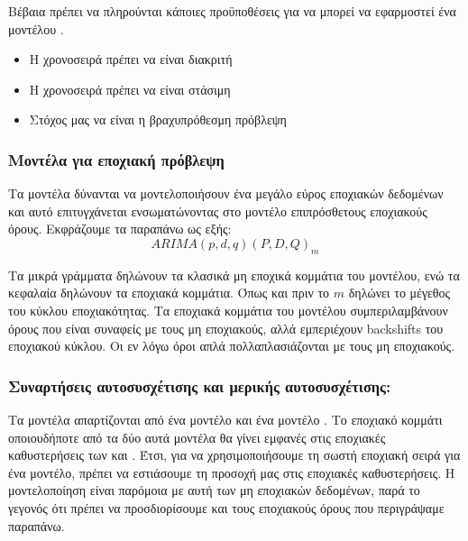 Βέβαια πρέπει να πληρούνται κάποιες προϋποθέσεις για να μπορεί να εφαρμοστεί ένα μοντέλου .
\begin{itemize}
  \item Η χρονοσειρά πρέπει να είναι διακριτή
  \item Η χρονοσειρά πρέπει να είναι στάσιμη 
  \item Στόχος μας να είναι η βραχυπρόθεσμη πρόβλεψη 
\end{itemize}

\subsubsection{Μοντέλα  για εποχιακή πρόβλεψη}
Τα μοντέλα  δύνανται να μοντελοποιήσουν ένα μεγάλο εύρος εποχιακών δεδομένων και αυτό επιτυγχάνεται ενσωματώνοντας στο μοντέλο επιπρόσθετους εποχιακούς όρους. Εκφράζουμε τα παραπάνω ως εξής:
\[ARIMA (p, d, q) (P, D, Q)_m \]

Τα μικρά γράμματα δηλώνουν τα κλασικά μη εποχικά κομμάτια του μοντέλου, ενώ τα κεφαλαία δηλώνουν τα εποχιακά κομμάτια. Όπως και πριν το $m$ δηλώνει το μέγεθος του κύκλου εποχιακότητας. Τα εποχιακά κομμάτια του μοντέλου συμπεριλαμβάνουν όρους που είναι συναφείς με τους μη εποχιακούς, αλλά εμπεριέχουν backshifts του εποχιακού κύκλου. Οι εν λόγω όροι απλά πολλαπλασιάζονται με τους μη εποχιακούς.

\subsubsection{Συναρτήσεις αυτοσυσχέτισης και μερικής αυτοσυσχέτισης: }

Τα μοντέλα  απαρτίζονται από ένα μοντέλο  και ένα μοντέλο . 
Το εποχιακό κομμάτι οποιουδήποτε από τα δύο αυτά  μοντέλα θα γίνει εμφανές στις εποχιακές καθυστερήσεις των  και . 
Έτσι, για να χρησιμοποιήσουμε τη σωστή εποχιακή σειρά για ένα μοντέλο, πρέπει να εστιάσουμε τη προσοχή μας στις εποχιακές καθυστερήσεις. Η μοντελοποίηση είναι παρόμοια με αυτή των μη εποχιακών δεδομένων, παρά το γεγονός ότι πρέπει να προσδιορίσουμε και τους εποχιακούς όρους που περιγράψαμε παραπάνω.


